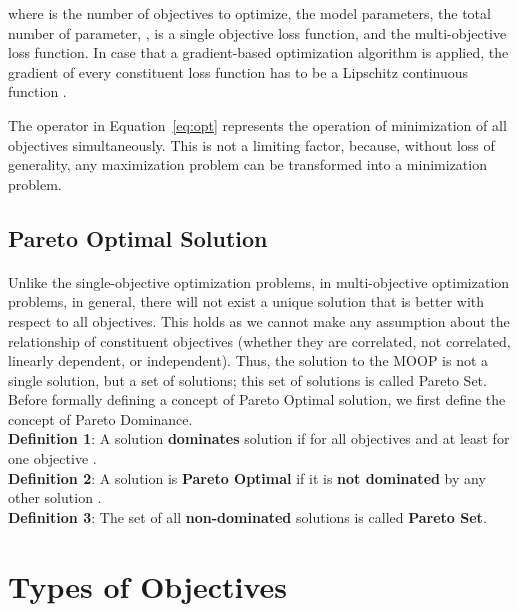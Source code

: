 \documentclass[letterpaper]{article}
\begin{document}
where  is the number of objectives to optimize,  the model parameters,  the total number of parameter, ,  is a single objective loss function, and  the multi-objective loss function. In case that a gradient-based optimization algorithm is applied, the gradient of every constituent loss function  has to be a Lipschitz continuous function \cite{murphy2013machine}.

The operator  in Equation~\ref{eq:opt} represents the operation of minimization of all objectives simultaneously. This is not a limiting factor, because, without loss of generality, any maximization problem can be transformed into a minimization problem.

\subsection{Pareto Optimal Solution}
\paragraph{}

Unlike  the  single-objective  optimization  problems,  in  multi-objective  optimization  problems, in general, there will not exist a unique solution that is better with respect to all objectives. This holds as we cannot make any assumption about the relationship of constituent objectives (whether they are correlated, not correlated, linearly dependent, or independent).  Thus, the solution to the MOOP is not a single solution, but a set of solutions; this set of solutions is called Pareto Set. Before formally defining a concept of Pareto Optimal solution, we first define the concept of Pareto Dominance.
\\
\newline
\textbf{Definition 1}: A solution  \textbf{dominates} solution  if for all objectives
 and at least for one objective
.\\
\newline
\textbf{Definition 2}: A solution  is \textbf{Pareto Optimal} if it is \textbf{not dominated} by any other solution .\\
\newline
\textbf{Definition 3}: The set of all \textbf{non-dominated} solutions is called \textbf{Pareto Set}.



\section{Types of Objectives}
\label{sec:objectives}
\end{document}
